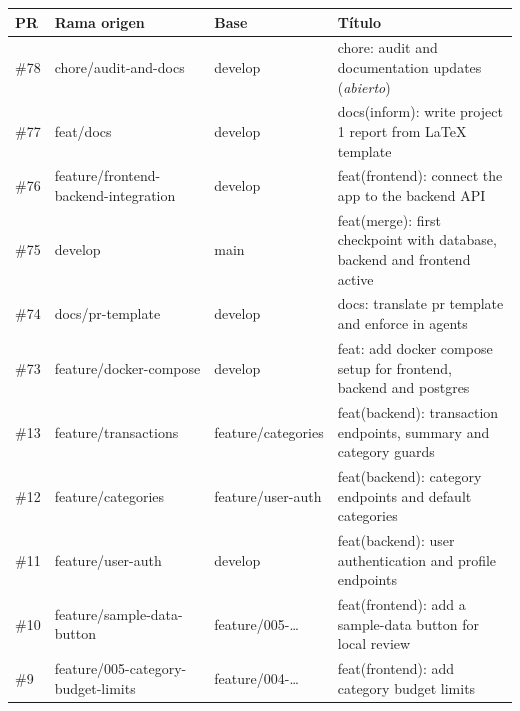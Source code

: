 \begin{table}[H]
    \centering
    \footnotesize
    \begin{tabularx}{\textwidth}{@{}p{0.7cm} p{5.3cm} p{2.9cm} X@{}}
        \toprule
        \textbf{PR} & \textbf{Rama origen}                   & \textbf{Base}      & \textbf{Título}                                                          \\
        \midrule
        \#78        & chore/audit-and-docs                   & develop            & chore: audit and documentation updates (\emph{abierto})                  \\
        \#77        & feat/docs                              & develop            & docs(inform): write project 1 report from LaTeX template                 \\
        \#76        & feature/frontend-backend-integration   & develop            & feat(frontend): connect the app to the backend API                       \\
        \#75        & develop                                & main               & feat(merge): first checkpoint with database, backend and frontend active \\
        \#74        & docs/pr-template                       & develop            & docs: translate pr template and enforce in agents                        \\
        \#73        & feature/docker-compose                 & develop            & feat: add docker compose setup for frontend, backend and postgres        \\
        \#13        & feature/transactions                   & feature/categories & feat(backend): transaction endpoints, summary and category guards        \\
        \#12        & feature/categories                     & feature/user-auth  & feat(backend): category endpoints and default categories                 \\
        \#11        & feature/user-auth                      & develop            & feat(backend): user authentication and profile endpoints                 \\
        \#10        & feature/sample-data-button             & feature/005-\ldots & feat(frontend): add a sample-data button for local review                \\
        \#9         & feature/005-category-budget-limits     & feature/004-\ldots & feat(frontend): add category budget limits                               \\

\end{tabularx}
\end{table}
